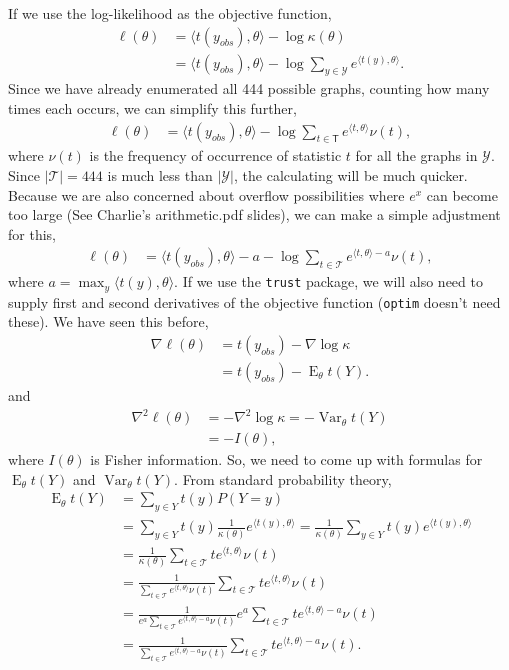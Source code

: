 \documentclass{amsbook}
\DeclareMathOperator{\E}{E}
\DeclareMathOperator{\Var}{Var}
\newcommand{\T}{\mathsf{T}}
\def\YY{{\mathcal Y}}
\def\TT{{\mathcal T}}
\newcommand{\inner}[1]{\langle #1 \rangle}
\theoremstyle{definition}
\theoremstyle{remark}
\begin{document}
If we use the log-likelihood as the objective function,
\begin{align*}
	\ell( \theta) &= \inner{t(y_{obs}), \theta} - \log \kappa( \theta ) \\
				&=  \inner{t(y_{obs}), \theta} - \log \sum_{y \in \YY}e^{\inner{t(y),
\theta}}.
\end{align*}
  Since we have already enumerated all 444 possible graphs, counting how many times 
each occurs, we can simplify this further, 
\begin{align*}
	\ell( \theta) &= \inner{t(y_{obs}), \theta} - \log \sum_{t \in \T}e^{\inner{t,
\theta}} \nu(t),
\end{align*}
where $\nu(t)$ is the frequency of occurrence of statistic $t$ for all the graphs in $
\YY$.  Since $|\TT| = 444$ is much less than $|\YY|$, the calculating will be much 
quicker.
Because we are also concerned about overflow possibilities where $e^x$ can become too 
large (See Charlie's arithmetic.pdf slides), we can make a simple adjustment for this, 
\begin{align*}
	\ell( \theta) &=  \inner{t(y_{obs}), \theta} - a - \log \sum_{t \in \TT}e^{\inner
{t,\theta}-a}\nu(t),
\end{align*}
where $a = \max_y \inner{t(y),\theta}$.  If we use the \texttt{trust} package, we will 
also need to supply first and second derivatives of the objective function (\texttt
{optim} doesn't need these).  We have seen this before,
\begin{align*}
	\nabla \ell( \theta ) &= t(y_{obs}) - \nabla \log \kappa \\
						&=  t(y_{obs}) - \E_\theta t(Y). 
\end{align*}
and
\begin{align*}
	\nabla^2 \ell( \theta ) &= - \nabla^2 \log \kappa = - \Var_\theta t(Y)\\
					&= -I(\theta),
\end{align*}
where $I(\theta)$ is Fisher information.  So, we need to come up with formulas for $\E_
\theta t(Y)$ and $\Var_\theta t(Y)$.  From standard probability theory, 
\begin{align*}
\E_\theta t(Y) &= \sum_{y\in Y} t(y) P( Y = y )\\
				&= \sum_{y\in Y} t(y) \frac{1}{\kappa(\theta)} e^{\inner{t(y),
\theta }} = \frac{1}{\kappa(\theta)} \sum_{y\in Y} t(y)  e^{\inner{t(y),\theta }} \\
				&= \frac{1}{\kappa(\theta)} \sum_{t\in \TT} t  e^{\inner{t,\theta }}
\nu(t) \\
				&= \frac{1}{\sum_{t\in \TT} e^{\inner{t,\theta }}\nu(t)} \sum_{t\in 
\TT} t  e^{\inner{t,\theta }}\nu(t) \\
				&= \frac{1}{e^a\sum_{t\in \TT} e^{\inner{t,\theta}-a}\nu(t)} e^a\sum_
{t\in \TT} t  e^{\inner{t,\theta}-a}\nu(t) \\
				&= \frac{1}{\sum_{t\in \TT} e^{\inner{t,\theta}-a}\nu(t)} \sum_{t\in 
\TT} t  e^{\inner{t,\theta}-a}\nu(t).
\end{align*}
\end{document}

